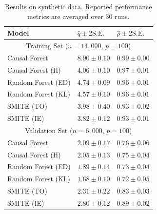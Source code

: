 \begin{table}[]
     \caption{Results on synthetic data. Reported performance metrics are averaged over $30$ runs. }
    \centering
    \begin{tabular}{|p{2.9cm}||p{2.1cm}|p{1.8cm}|}
         \hline
         Model &  $\hat{q} \pm 2\mathrm{S.E.}$ & $\hat{\rho} \pm 2\mathrm{S.E.}$\\
         \hline
         \multicolumn{3}{|c|}{Training Set ($n=14,000$, $p=100$)} \\
         \hline
         Causal Forest   & $8.90 \pm 0.10$  & $0.99 \pm 0.00$\\
         Causal Forest (H) & $4.06 \pm 0.10$ & $0.97 \pm 0.01$ \\
         Random Forest (ED) & $4.74 \pm 0.09$ & $ 0.96 \pm 0.01$ \\
         Random Forest (KL) & $4.57 \pm 0.10$ & $0.96 \pm 0.01$ \\
         SMITE (TO) & $3.98 \pm 0.40$  & $0.93 \pm 0.02$ \\
         SMITE (IE) &$3.82 \pm 0.12$  & $0.93 \pm 0.01$\\
         \hline
         \multicolumn{3}{|c|}{Validation Set ($n=6,000$, $p=100$)} \\
         \hline
         Causal Forest   & $2.09 \pm 0.17$ & $0.76 \pm 0.06$ \\
         Causal Forest (H) & $2.05 \pm 0.13$   & $0.75 \pm 0.04$ \\
         Random Forest (ED) & $1.89 \pm 0.14$ & $0.73 \pm 0.04$ \\
         Random Forest (KL) & $1.68 \pm 0.10$ & $0.72 \pm 0.05$ \\
         SMITE (TO) &  $2.31 \pm 0.22$ & $0.83 \pm 0.03$ \\
         SMITE (IE) &  $\mathbf{2.80} \pm 0.12$ & $\mathbf{0.89} \pm 0.02$\\
         \hline
    \end{tabular}
    \label{tab:synthe_perf}
\end{table}